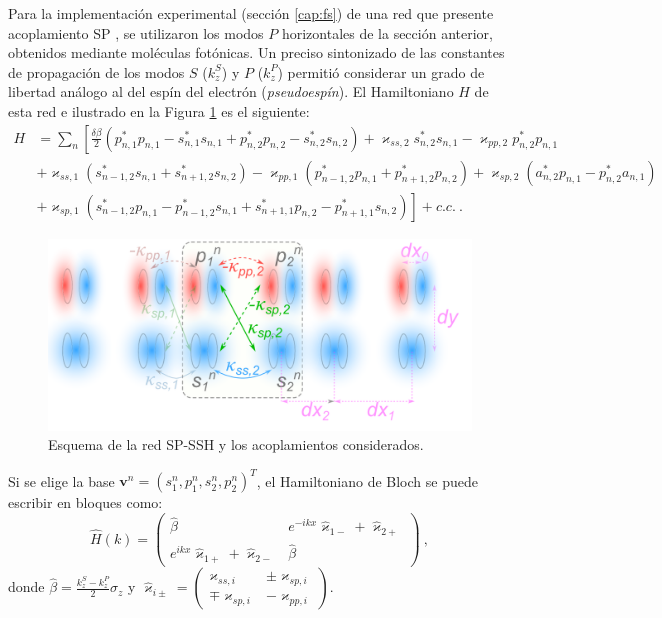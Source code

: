 Para la implementación experimental (sección \ref{cap:fs}) de una red que presente acoplamiento SP \citep{interorbital, toporusos, SPSSH}, se utilizaron los modos $P$ horizontales de la sección anterior, obtenidos mediante moléculas fotónicas. Un preciso sintonizado de las constantes de propagación de los modos $S$ ($k_z^S$) y $P$ ($k_z^P$) permitió considerar un grado de libertad análogo al del espín del electrón (\textit{pseudoespín}). El Hamiltoniano $H$ de esta red \citep{SPSSH} e ilustrado en la Figura \ref{fig:sp-ssh-model} es el siguiente:
\begin{align*}
	H &= \sum_n \left[\frac{\delta\beta}{2} \left( p^*_{n, 1} p_{n, 1} - s^*_{n, 1} s_{n, 1} + p^*_{n, 2} p_{n, 2} - s^*_{n, 2} s_{n, 2} \right) +\varkappa_{ss, 2}s^*_{n, 2} s_{n, 1} -\varkappa_{pp, 2}p^*_{n, 2} p_{n, 1} \right. 
	\\	
	&+ \varkappa_{ss, 1} \left( s_{n-1, 2}^*s_{n, 1} + s_{n+1, 2}^*s_{n, 2} \right) - \varkappa_{pp, 1} \left( p_{n-1, 2}^*p_{n, 1} + p_{n+1, 2}^*p_{n, 2} \right) + \varkappa_{sp, 2} \left( a_{n, 2}^* p_{n, 1} - p_{n, 2}^* a_{n, 1} \right)
	\\
	&+ \left. \varkappa_{sp, 1} \left( s_{n-1, 2}^* p_{n, 1} - p_{n-1, 2}^* s_{n, 1} + s_{n+1, 1}^*p_{n, 2} - p_{n+1, 1}^* s_{n, 2} \right) \right] + c.c. \ .
\end{align*}

\begin{figure}[H]
\centering
	\includegraphics[width=0.7\linewidth]{media/ssh_sp_model}
	\caption{Esquema de la red SP-SSH y los acoplamientos considerados. \label{fig:sp-ssh-model}}
\end{figure}
Si se elige la base $\textbf{v}^n = \left( s_1^n, p_1^n, s_2^n, p_2^n \right)^T$, el Hamiltoniano de Bloch se puede escribir en bloques como:
\begin{equation*}
	\hat{H}(k) = \begin{pmatrix}
		\hat{\beta} & e^{-ikx} \hat{\varkappa}_{1-} +  \hat{\varkappa}_{2+}
		\\
		e^{ikx} \hat{\varkappa}_{1+} +  \hat{\varkappa}_{2-} & \hat{\beta}
	\end{pmatrix} \ , 
\end{equation*}
donde $\hat{\beta} = \frac{k_z^S - k_z^P}{2} \hat{\sigma}_z$ y $\hat{\varkappa}_{i\pm} = \begin{pmatrix}
	\varkappa_{ss, i} & \pm\varkappa_{sp, i}
	\\
	\mp\varkappa_{sp, i} & - \varkappa_{pp, i}
\end{pmatrix}$.

